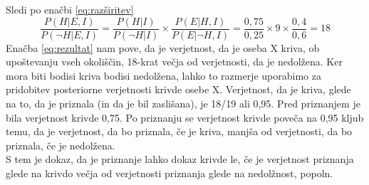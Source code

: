 \documentclass[mat1, tisk]{fmfdelo}
\theoremstyle{definition} %
\theoremstyle{trditev} %
\theoremstyle{izrek}
\begin{document}
Sledi po enačbi \eqref{eq:razširitev}
\begin{equation}\label{eq:rezultat}
    \frac{P(H \lvert E, I)}{P(\neg H \lvert E, I)}  = \frac{P(H \lvert I)}{P(\neg H \lvert I)}  \times \frac{P(E \lvert H, I)}{P(E \lvert \neg H, I)} = \frac{0,75}{0,25} \times 9 \times \frac{0,4}{0,6} = 18
\end{equation}
Enačba \eqref{eq:rezultat} nam pove, da je verjetnost, da je oseba X kriva, ob upoštevanju vseh okoliščin, 18-krat večja od verjetnosti, da je nedolžena. Ker mora biti 
bodisi kriva bodisi nedolžena, lahko to razmerje uporabimo za pridobitev posteriorne verjetnosti krivde osebe X. Verjetnost, da je kriva, glede na to, 
da je priznala (in da je bil zaslišana), je 18/19 ali 0,95. Pred priznanjem je bila verjetnost krivde 0,75. Po priznanju se verjetnost krivde poveča 
na 0,95 kljub temu, da je verjetnost, da bo priznala, če je kriva, manjša od verjetnosti, da bo priznala, če je nedolžena. \\
S tem je dokaz, da je priznanje lahko dokaz krivde le, če je verjetnost priznanja glede na krivdo večja od verjetnosti priznanja glede na nedolžnost, popoln.

\end{document}

